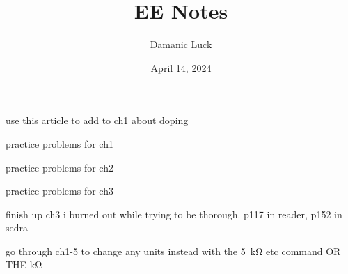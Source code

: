\documentclass[10pt, openany]{book}
\title{EE Notes}
\author{Damanic Luck}
\date{April 14, 2024}
\begin{document}

\maketitle

\tableofcontents
\begin{todo}
    \item use this article \href{http://home.iitj.ac.in/~sptiwari/EE314/Lecture2_Semi_Basics_Junction.pdf}{to add to ch1 about doping}
    \item practice problems for ch1
    \item practice problems for ch2
    \item practice problems for ch3
    \item finish up ch3 i burned out while trying to be thorough. p117 in reader, p152 in sedra
    \item go through ch1-5 to change any units instead with the \SI{5}{\kilo \ohm} etc command OR THE \unit[per-mode=symbol]{\kilo \ohm}
\end{todo}

\newpage


\newpage


\newpage


\newpage


\newpage 


\newpage

\end{document}
